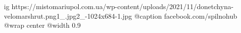  
 
 
 
 

\ifcmt
  ig https://mistomariupol.com.ua/wp-content/uploads/2021/11/donetchyna-velomarshrut.png1_.jpg2_-1024x684-1.jpg
	@caption facebook.com/spilnohub
  @wrap center
  @width 0.9
\fi
